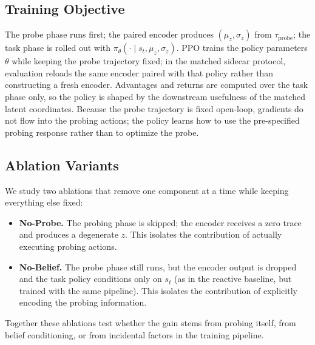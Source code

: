 \subsection{Training Objective}

The probe phase runs first; the paired encoder produces $(\mu_z, \sigma_z)$ from $\tau_{\mathrm{probe}}$; the task phase is rolled out with $\pi_\theta(\cdot \mid s_t, \mu_z, \sigma_z)$. PPO trains the policy parameters $\theta$ while keeping the probe trajectory fixed; in the matched sidecar protocol, evaluation reloads the same encoder paired with that policy rather than constructing a fresh encoder. Advantages and returns are computed over the task phase only, so the policy is shaped by the downstream usefulness of the matched latent coordinates. Because the probe trajectory is fixed open-loop, gradients do not flow into the probing actions; the policy learns how to use the pre-specified probing response rather than to optimize the probe.

\subsection{Ablation Variants}

We study two ablations that remove one component at a time while keeping everything else fixed:
\begin{itemize}
    \item \textbf{No-Probe.} The probing phase is skipped; the encoder receives a zero trace and produces a degenerate $z$. This isolates the contribution of actually executing probing actions.
    \item \textbf{No-Belief.} The probe phase still runs, but the encoder output is dropped and the task policy conditions only on $s_t$ (as in the reactive baseline, but trained with the same pipeline). This isolates the contribution of explicitly encoding the probing information.
\end{itemize}
Together these ablations test whether the gain stems from probing itself, from belief conditioning, or from incidental factors in the training pipeline.
